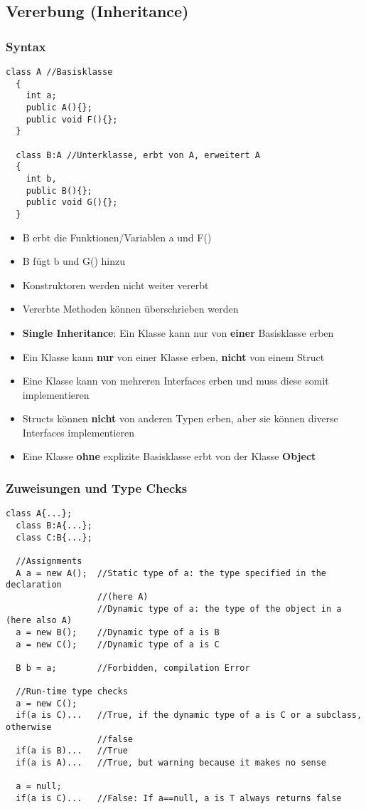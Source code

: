 \subsection{Vererbung (Inheritance)}
\subsubsection{Syntax}
\begin{lstlisting}[style=Csharp]
  class A //Basisklasse
  {
    int a; 
    public A(){};
    public void F(){};
  }
  
  class B:A //Unterklasse, erbt von A, erweitert A
  {
    int b, 
    public B(){};
    public void G(){};
  }
\end{lstlisting}
\begin{itemize}
  \item B erbt die Funktionen/Variablen a und F()
  \item B fügt b und G() hinzu
  \item Konstruktoren werden nicht weiter vererbt
  \item Vererbte Methoden können überschrieben werden
  \item \textbf{Single Inheritance}: Ein Klasse kann nur von \textbf{einer}
  Basisklasse erben 
  \item Ein Klasse kann \textbf{nur} von einer Klasse erben, \textbf{nicht} von
  einem Struct
  \item Eine Klasse kann von mehreren Interfaces erben und 
  muss diese somit implementieren
  \item Structs können \textbf{nicht} von anderen Typen erben, aber sie können
  diverse Interfaces implementieren
  \item Eine Klasse \textbf{ohne} explizite Basisklasse erbt von der Klasse
  \textbf{Object}
\end{itemize}
 
\subsubsection{Zuweisungen und Type Checks}
\begin{lstlisting}[style=Csharp]
  class A{...};
  class B:A{...};
  class C:B{...};
  
  //Assignments
  A a = new A();  //Static type of a: the type specified in the declaration
                  //(here A)
                  //Dynamic type of a: the type of the object in a (here also A)
  a = new B();    //Dynamic type of a is B
  a = new C();    //Dynamic type of a is C
  
  B b = a;        //Forbidden, compilation Error
  
  //Run-time type checks
  a = new C(); 
  if(a is C)...   //True, if the dynamic type of a is C or a subclass, otherwise
                  //false
  if(a is B)...   //True
  if(a is A)...   //True, but warning because it makes no sense
  
  a = null; 
  if(a is C)...   //False: If a==null, a is T always returns false
\end{lstlisting}

